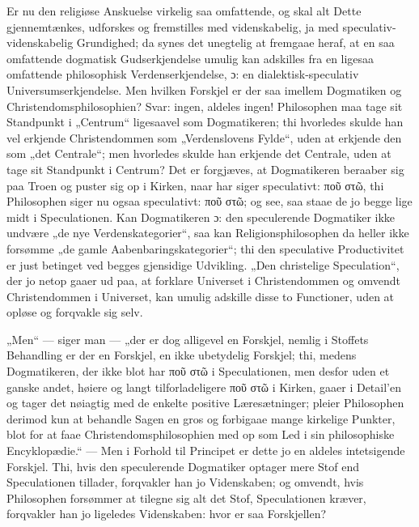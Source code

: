 Er nu den religiøse Anskuelse virkelig saa omfattende, og skal alt
Dette gjennemtænkes, udforskes og fremstilles med videnskabelig,
ja med speculativ-videnskabelig Grundighed; da
 synes det unegtelig at fremgaae heraf, at en saa omfattende
dogmatisk Gudserkjendelse umulig kan adskilles fra en ligesaa
omfattende philosophisk Verdenserkjendelse, ɔ: en
dialektisk-speculativ Universumserkjendelse. Men hvilken Forskjel
er der saa imellem Dogmatiken og Christendomsphilosophien? Svar:
ingen, aldeles ingen! Philosophen maa tage sit Standpunkt i
„Centrum“ ligesaavel som Dogmatikeren; thi hvorledes skulde han
vel erkjende Christendommen som „Verdenslovens Fylde“, uden at
erkjende den som „det Centrale“; men hvorledes skulde han
erkjende det Centrale, uden at tage sit Standpunkt i Centrum? Det
er forgjæves, at Dogmatikeren beraaber sig paa Troen og puster sig
op i Kirken, naar har
{} siger speculativt: ποῦ στῶ, thi Philosophen siger nu ogsaa
speculativt: ποῦ στῶ; og see, saa staae de jo begge lige midt i
Speculationen. Kan Dogmatikeren ɔ: den speculerende Dogmatiker
ikke undvære „de nye Verdenskategorier“, saa kan
Religionsphilosophen da heller ikke forsømme „de gamle
Aabenbaringskategorier“; thi den speculative Productivitet er just
betinget ved begges gjensidige Udvikling. „Den christelige
Speculation“, der jo netop gaaer ud paa, at forklare Universet i
Christendommen og omvendt Christendommen i Universet, kan umulig
adskille disse to Functioner, uden at opløse og forqvakle sig
selv.

„Men“ --- siger man --- „der er dog alligevel en Forskjel, nemlig
i Stoffets Behandling er der en Forskjel, en ikke ubetydelig
Forskjel; thi, medens Dogmatikeren, der ikke blot har ποῦ στῶ i
Speculationen, men desfor%
uden et ganske andet, høiere og langt tilforladeligere ποῦ στῶ i
Kirken, gaaer i Detail'en og tager det nøiagtig med de enkelte
positive Læresætninger; pleier Philosophen derimod kun at behandle
Sagen en gros og forbigaae mange kirkelige Punkter, blot for at
faae Christendomsphilosophien med op som Led i sin philosophiske
Encyklopædie.“ --- Men i Forhold til Principet er dette jo en
aldeles intetsigende Forskjel. Thi, hvis den speculerende
Dogmatiker optager mere Stof end Speculationen tillader,
forqvakler han jo Videnskaben; og omvendt, hvis Philosophen
forsømmer at tilegne sig alt det Stof, Speculationen kræver,
forqvakler han jo ligeledes Videnskaben: hvor er saa Forskjellen?

